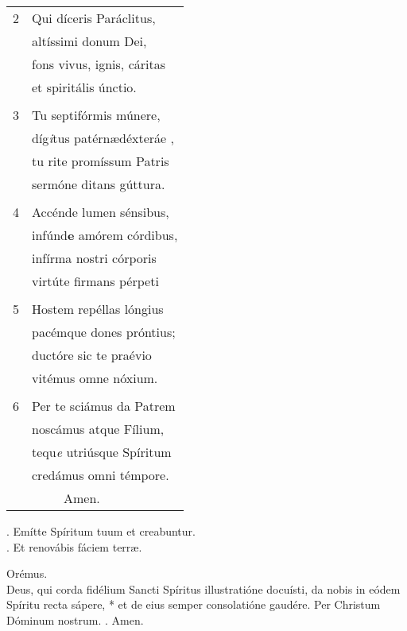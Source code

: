 \documentclass[12pt, a5paper]{book}
\begin{document}
\begin{tabular}{ll}
2 &Qui díceris Paráclitus,\\
&altíssimi donum Dei,\\
&fons vivus, ignis, cáritas\\
&et spiritális únctio.\\
\\
3 &Tu septifórmis múnere,\\
&díg{\it i}tus patérn\ae déxteráe ,\\
&tu rite promíssum Patris\\
&sermóne ditans gúttura.\\
\\
4 &Accénde lumen sénsibus,\\
&infúnd{\bf e} amórem córdibus,\\
&infírma nostri córporis\\
&virtúte firmans pérpeti\\
\\
5 &Hostem repéllas lóngius\\
&pacémque dones próntius;\\
&ductóre sic te praévio\\
&vitémus omne nóxium.\\
\\
6 &Per te sciámus da Patrem\\
&noscámus atque Fílium,\\
&tequ{\it e} utriúsque Spíritum\\
&credámus omni témpore.\\
&\ \ \ \ \ Amen.
\end{tabular}

\Vbar . Emítte Spíritum tuum et creabuntur.\\
\Rbar . Et renovábis fáciem terr\ae .

Orémus.\\
\vspace{2mm}
Deus, qui corda fidélium Sancti Spíritus illustratióne docuísti, \dag da nobis in eódem Spíritu recta sápere, * et de eius semper consolatióne gaudére. Per Christum Dóminum nostrum. \Rbar. Amen.




\end{document}
